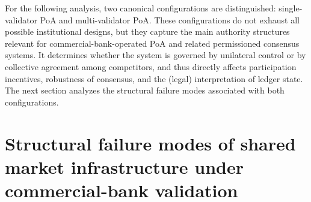 \documentclass[
reprint,
showkeys,
superscriptaddress,
aps,
pra,
longbibliography,
nofootinbib,
]{revtex4-2}
\theoremstyle{definition}\newtheorem{definition}{Definition}
\begin{document}
For the following analysis, two canonical configurations are distinguished: single-validator PoA and multi-validator PoA.
These configurations do not exhaust all possible institutional designs, but they capture the main authority structures relevant for commercial-bank-operated PoA and related permissioned consensus systems.
It determines whether the system is governed by unilateral control or by collective agreement among competitors, and thus directly affects participation incentives, robustness of consensus, and the (legal) interpretation of ledger state.
The next section analyzes the structural failure modes associated with both configurations.







\section{Structural failure modes of shared market infrastructure under commercial-bank validation}
\label{sec:failure-modes}
\end{document}
